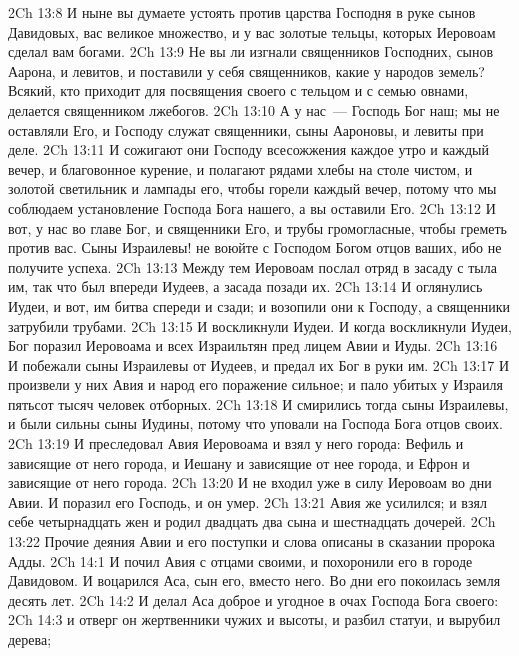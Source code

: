 \vs 2Ch 13:8 И ныне вы думаете устоять против царства Господня в руке сынов Давидовых,  вас великое множество, и у вас золотые тельцы, которых Иеровоам сделал вам богами.
\vs 2Ch 13:9 Не вы ли изгнали священников Господних, сынов Аарона, и левитов, и поставили у себя священников, какие у народов  земель? Всякий, кто приходит для посвящения своего с тельцом и с семью овнами, делается  священником лжебогов.
\vs 2Ch 13:10 А у нас~--- Господь Бог наш; мы не оставляли Его, и Господу служат священники, сыны Аароновы, и левиты при  деле.
\vs 2Ch 13:11 И сожигают они Господу всесожжения каждое утро и каждый вечер, и благовонное курение, и полагают рядами хлебы на столе чистом, и  золотой светильник и лампады его, чтобы горели каждый вечер, потому что мы соблюдаем установление Господа Бога нашего, а вы оставили Его.
\vs 2Ch 13:12 И вот, у нас во главе Бог, и священники Его, и трубы громогласные, чтобы греметь против вас. Сыны Израилевы! не воюйте с Господом Богом отцов ваших, ибо не получите успеха.
\rsbpar\vs 2Ch 13:13 Между тем Иеровоам послал отряд в засаду с тыла им, так что  был впереди Иудеев, а засада позади их.
\vs 2Ch 13:14 И оглянулись Иудеи, и вот, им битва спереди и сзади; и возопили они к Господу, а священники затрубили трубами.
\vs 2Ch 13:15 И воскликнули Иудеи. И когда воскликнули Иудеи, Бог поразил Иеровоама и всех Израильтян пред лицем Авии и Иуды.
\vs 2Ch 13:16 И побежали сыны Израилевы от Иудеев, и предал их Бог в руки им.
\vs 2Ch 13:17 И произвели у них Авия и народ его поражение сильное; и пало убитых у Израиля пятьсот тысяч человек отборных.
\vs 2Ch 13:18 И смирились тогда сыны Израилевы, и были сильны сыны Иудины, потому что уповали на Господа Бога отцов своих.
\vs 2Ch 13:19 И преследовал Авия Иеровоама и взял у него города: Вефиль и зависящие от него города, и Иешану и зависящие от нее города, и Ефрон и зависящие от него города.
\vs 2Ch 13:20 И не входил уже в силу Иеровоам во дни Авии. И поразил его Господь, и он умер.
\vs 2Ch 13:21 Авия же усилился; и взял себе четырнадцать жен и родил двадцать два сына и шестнадцать дочерей.
\rsbpar\vs 2Ch 13:22 Прочие деяния Авии и его поступки и слова описаны в сказании пророка Адды.
\vs 2Ch 14:1 И почил Авия с отцами своими, и похоронили его в городе Давидовом. И воцарился Аса, сын его, вместо него. Во дни его покоилась земля десять лет.
\vs 2Ch 14:2 И делал Аса доброе и угодное в очах Господа Бога своего:
\vs 2Ch 14:3 и отверг он жертвенники  чужих и высоты, и разбил статуи, и вырубил  дерева;
